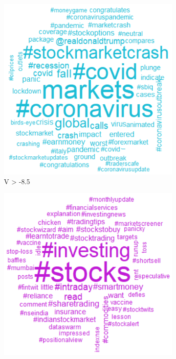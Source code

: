 \documentclass[a4paper, 12pt]{report}
\begin{document}
    \begin{figure}[H]
    \begin{subfigure}[t]{.32\textwidth}
        \centering
        \includegraphics[width=\textwidth]{graphs/Twitter/var_wcloud_twt1.png}
        \caption{V > -8.5}
        \label{Fig:var_wcloud_twt1}
    \end{subfigure}
    \begin{subfigure}[t]{.32\textwidth}
        \centering
        \includegraphics[width=\textwidth]{graphs/Twitter/var_wcloud_twt2.png}

\end{subfigure}
\end{figure}
\end{document}
